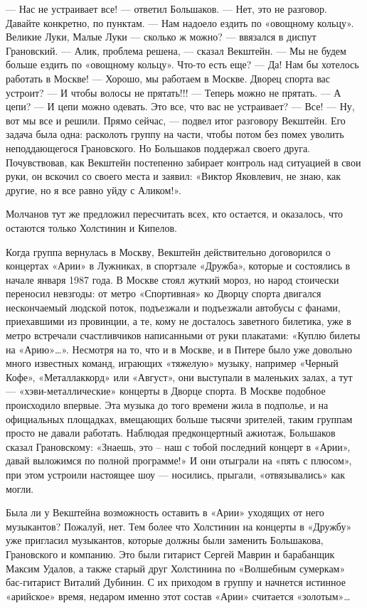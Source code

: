 \documentclass[16pt,a5paper]{book}
\begin{document}
— Нас не устраивает все! — ответил Большаков.
— Нет, это не разговор. Давайте конкретно, по пунктам.
— Нам надоело ездить по «овощному кольцу». Великие Луки, Малые Луки — сколько ж можно? — ввязался в диспут Грановский.
— Алик, проблема решена, — сказал Векштейн. — Мы не будем больше ездить по «овощному кольцу». Что-то есть еще?
— Да! Нам бы хотелось работать в Москве!
— Хорошо, мы работаем в Москве. Дворец спорта вас устроит?
— И чтобы волосы не прятать!!!
— Теперь можно не прятать.
— А цепи?
— И цепи можно одевать. Это все, что вас не устраивает?
— Все!
— Ну, вот мы все и решили. Прямо сейчас, — подвел итог разговору Векштейн. Его задача была одна: расколоть группу на
части, чтобы потом без помех уволить неподдающегося Грановского. Но Большаков поддержал своего друга. Почувствовав, как
Векштейн постепенно забирает контроль над ситуацией в свои руки, он вскочил со своего места и заявил: «Виктор Яковлевич,
не знаю, как другие, но я все равно уйду с Аликом!».

Молчанов тут же предложил пересчитать всех, кто остается, и оказалось, что остаются только Холстинин и Кипелов.

Когда группа вернулась в Москву, Векштейн действительно договорился о концертах «Арии» в Лужниках, в спортзале «Дружба»,
которые и состоялись в начале января 1987 года. В Москве стоял жуткий мороз, но народ стоически переносил невзгоды: от
метро «Спортивная» ко Дворцу спорта двигался нескончаемый людской поток, подъезжали и подъезжали автобусы с фанами,
приехавшими из провинции, а те, кому не досталось заветного билетика, уже в метро встречали счастливчиков написанными от
руки плакатами: «Куплю билеты на «Арию»\ldots». Несмотря на то, что и в Москве, и в Питере было уже довольно много
известных команд, играющих «тяжелую» музыку, например «Черный Кофе», «Металлаккорд» или «Август», они выступали в
маленьких залах, а тут — «хэви-металлические» концерты в Дворце спорта. В Москве подобное происходило впервые. Эта
музыка до того времени жила в подполье, и на официальных площадках, вмещающих больше тысячи зрителей, таким группам
просто не давали работать. Наблюдая предконцертный ажиотаж, Большаков сказал Грановскому: «Знаешь, это – наш с тобой
последний концерт в «Арии», давай выложимся по полной программе!» И они отыграли на «пять с плюсом», при этом устроили
настоящее шоу — носились, прыгали, «отвязывались» как могли.

Была ли у Векштейна возможность оставить в «Арии» уходящих от него музыкантов? Пожалуй, нет. Тем более что Холстинин на
концерты в «Дружбу» уже пригласил музыкантов, которые должны были заменить Большакова, Грановского и компанию. Это были
гитарист Сергей Маврин и барабанщик Максим Удалов, а также старый друг Холстинина по «Волшебным сумеркам» бас-гитарист
Виталий Дубинин. С их приходом в группу и начнется истинное «арийское» время, недаром именно этот состав «Арии»
считается «золотым»\ldots
\end{document}
